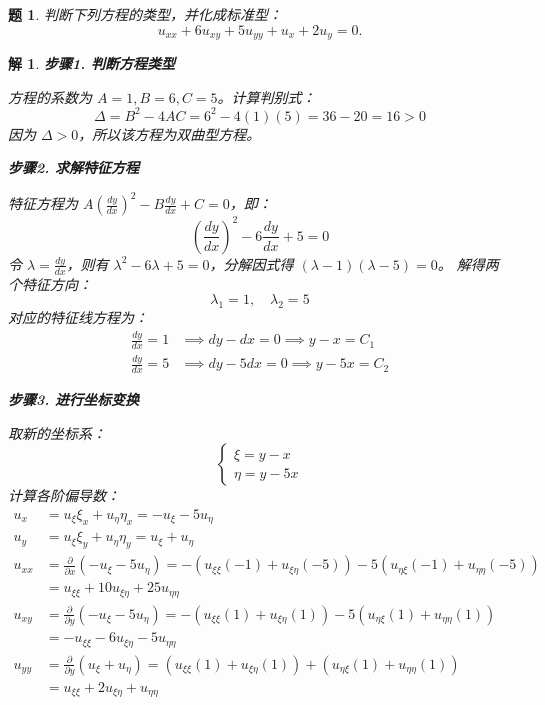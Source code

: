 \documentclass[12pt,a4paper]{article}
\newtheorem{problem}{题}
\newtheorem*{solution}{解}
\begin{document}
	\begin{problem}
		判断下列方程的类型，并化成标准型：
		\[
		u_{xx} + 6u_{xy} + 5u_{yy} + u_x + 2u_y = 0.
		\]
	\end{problem}
	\hrulefill
	\begin{solution}
		\textbf{步骤1. 判断方程类型}
		
		\noindent
		方程的系数为 $A=1, B=6, C=5$。计算判别式：
		\[
		\Delta = B^2 - 4AC = 6^2 - 4(1)(5) = 36 - 20 = 16 > 0
		\]
		因为 $\Delta > 0$，所以该方程为双曲型方程。
		
		\hrulefill
		
		\textbf{步骤2. 求解特征方程}
		
		\noindent
		特征方程为 $A \left(\frac{dy}{dx}\right)^2 - B \frac{dy}{dx} + C = 0$，即：
		\[
		\left(\frac{dy}{dx}\right)^2 - 6\frac{dy}{dx} + 5 = 0
		\]
		令 $\lambda = \frac{dy}{dx}$，则有 $\lambda^2 - 6\lambda + 5 = 0$，分解因式得 $(\lambda - 1)(\lambda - 5) = 0$。
		解得两个特征方向：
		\[
		\lambda_1 = 1, \quad \lambda_2 = 5
		\]
		对应的特征线方程为：
		\begin{align*}
			\frac{dy}{dx} = 1 &\implies dy - dx = 0 \implies y - x = C_1 \\
			\frac{dy}{dx} = 5 &\implies dy - 5dx = 0 \implies y - 5x = C_2
		\end{align*}
		
		\hrulefill
		
		\textbf{步骤3. 进行坐标变换}
		
		\noindent
		取新的坐标系：
		\[
		\begin{cases}
			\xi = y - x \\
			\eta = y - 5x
		\end{cases}
		\]
		计算各阶偏导数：
		\begin{align*}
			u_x &= u_\xi \xi_x + u_\eta \eta_x = -u_\xi - 5u_\eta \\
			u_y &= u_\xi \xi_y + u_\eta \eta_y = u_\xi + u_\eta \\
			u_{xx} &= \frac{\partial}{\partial x}(-u_\xi - 5u_\eta) = -(u_{\xi\xi}(-1) + u_{\xi\eta}(-5)) - 5(u_{\eta\xi}(-1) + u_{\eta\eta}(-5)) \\
			&= u_{\xi\xi} + 10u_{\xi\eta} + 25u_{\eta\eta} \\
			u_{xy} &= \frac{\partial}{\partial y}(-u_\xi - 5u_\eta) = -(u_{\xi\xi}(1) + u_{\xi\eta}(1)) - 5(u_{\eta\xi}(1) + u_{\eta\eta}(1)) \\
			&= -u_{\xi\xi} - 6u_{\xi\eta} - 5u_{\eta\eta} \\
			u_{yy} &= \frac{\partial}{\partial y}(u_\xi + u_\eta) = (u_{\xi\xi}(1) + u_{\xi\eta}(1)) + (u_{\eta\xi}(1) + u_{\eta\eta}(1)) \\
			&= u_{\xi\xi} + 2u_{\xi\eta} + u_{\eta\eta}
		\end{align*}
		

\end{solution}
\end{document}
